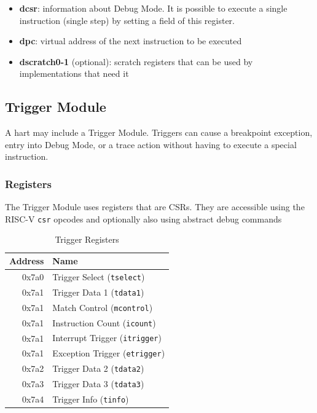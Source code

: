 \documentclass{article}
\begin{document}
	\begin{itemize}
	\item \textbf{dcsr}: information about Debug Mode. It is possible to execute a single instruction (single step) by setting a field of this register.
	\item \textbf{dpc}: virtual address of the next instruction to be executed
	\item \textbf{dscratch0-1} (optional): scratch registers that can be used by implementations that need it
	\end{itemize}
	
	\subsection{Trigger Module}
	
	A hart may include a Trigger Module. Triggers can cause a breakpoint exception, entry into Debug Mode, or a trace action without having to execute a special instruction.
	
	\subsubsection{Registers}
	
	The Trigger Module uses registers that are CSRs. They are accessible using the RISC-V {\tt csr} opcodes and optionally also using abstract debug commands
	
	\begin{table}[H]
   \begin{center}
      \caption{Trigger Registers}
      \begin{tabular}{|r|l|}
      \hline
      Address & Name \\
      \hline
0x7a0 & Trigger Select ({\tt tselect}) \\
0x7a1 & Trigger Data 1 ({\tt tdata1}) \\
0x7a1 & Match Control ({\tt mcontrol}) \\
0x7a1 & Instruction Count ({\tt icount}) \\
0x7a1 & Interrupt Trigger ({\tt itrigger}) \\
0x7a1 & Exception Trigger ({\tt etrigger}) \\
0x7a2 & Trigger Data 2 ({\tt tdata2}) \\
0x7a3 & Trigger Data 3 ({\tt tdata3}) \\
0x7a4 & Trigger Info ({\tt tinfo}) \\
         \hline
      \end{tabular}
   \end{center}
	\end{table}
	
\end{document}
